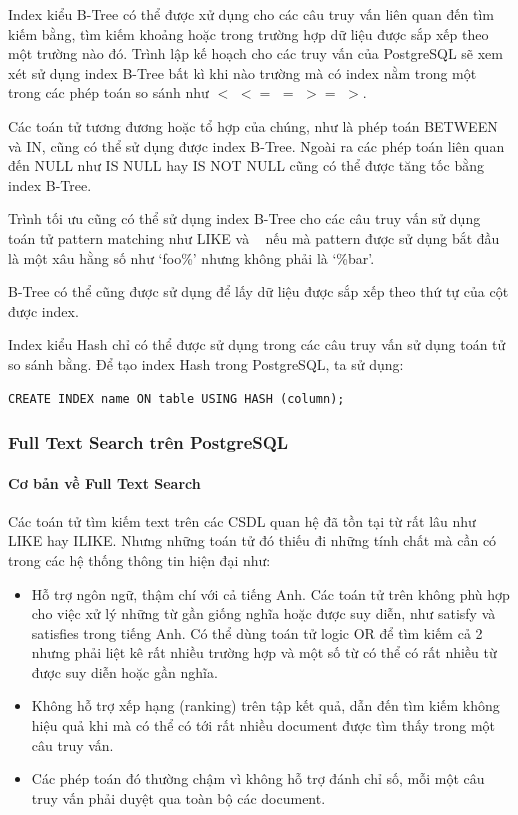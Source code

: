 Index kiểu B-Tree có thể được xử dụng cho các câu truy vấn
liên quan đến tìm kiếm bằng, tìm kiếm khoảng hoặc trong trường
hợp dữ liệu được sắp xếp theo một trường nào đó. Trình lập kế hoạch
cho các truy vấn của PostgreSQL sẽ xem xét sử dụng index B-Tree
bất kì khi nào trường mà có index nằm trong một trong
các phép toán so sánh như $<$ $<=$ $=$ $>=$ $>$.

Các toán tử tương đương hoặc tổ hợp của chúng, như là phép toán
BETWEEN và IN, cũng có thể sử dụng được index B-Tree.
Ngoài ra các phép toán liên quan đến NULL như IS NULL hay
IS NOT NULL cũng có thể được tăng tốc bằng index B-Tree.

Trình tối ưu cũng có thể sử dụng index B-Tree cho các câu
truy vấn sử dụng toán tử pattern matching như LIKE và ~
nếu mà pattern được sử dụng bắt đầu là một xâu hằng số
như ‘foo\%’ nhưng không phải là ‘\%bar’. 

B-Tree có thể cũng được sử dụng để lấy dữ liệu được sắp
xếp theo thứ tự của cột được index.

Index kiểu Hash chỉ có thể được sử dụng trong các câu truy
vấn sử dụng toán tử so sánh bằng. Để tạo index Hash trong PostgreSQL,
ta sử dụng:
\begin{lstlisting}[caption={Tạo index sử dụng Hash}, captionpos=b]
CREATE INDEX name ON table USING HASH (column);
\end{lstlisting}

\subsubsection{Full Text Search trên PostgreSQL}
\paragraph{Cơ bản về Full Text Search}
Các toán tử tìm kiếm text trên các CSDL quan hệ đã tồn
tại từ rất lâu như LIKE hay ILIKE. Nhưng những toán tử đó thiếu
đi những tính chất mà cần có trong các hệ thống thông tin hiện đại như:
\begin{itemize}[topsep=0ex]
\item Hỗ trợ ngôn ngữ, thậm chí với cả tiếng Anh. Các toán tử
    trên không phù hợp cho việc xử lý những từ gần giống nghĩa hoặc
    được suy diễn, như satisfy và satisfies trong tiếng Anh. Có thể
    dùng toán tử logic OR để tìm kiếm cả 2 nhưng phải liệt kê rất
    nhiều trường hợp và một số từ có thể có rất nhiều từ
    được suy diễn hoặc gần nghĩa.

\item Không hỗ trợ xếp hạng (ranking) trên tập kết quả,
    dẫn đến tìm kiếm không hiệu quả khi mà có thể có tới rất
    nhiều document được tìm thấy trong một câu truy vấn.

\item Các phép toán đó thường chậm vì không hỗ trợ đánh chỉ
    số, mỗi một câu truy vấn phải duyệt qua toàn bộ các document.
\end{itemize}

